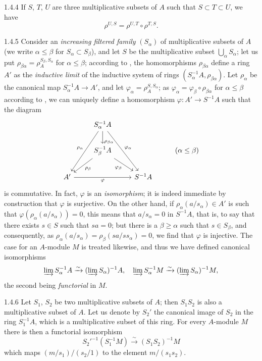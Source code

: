 \begin{env}{1.4.4}
\label{env-0.1.4.4}
If $S$, $T$, $U$ are three multiplicative subsets of $A$ such that $S\subset T\subset U$, we have
\[
  \rho^{U,S}=\rho^{U,T}\circ\rho^{T,S}.
\]
\end{env}

\begin{env}{1.4.5}
\label{env-0.1.4.5}
Consider an \emph{increasing filtered family} $(S_\alpha)$ of multiplicative subsets of $A$
(we write $\alpha\leq\beta$ for $S_\alpha\subset S_\beta$), and let $S$ be the multiplicative subset
$\bigcup_\alpha S_\alpha$; let us put $\rho_{\beta\alpha}=\rho_A^{S_\beta,S_\alpha}$ for $\alpha\leq\beta$;
according to , the homomorphisms $\rho_{\beta\alpha}$ define a ring $A'$ as the \emph{inductive limit}
of the inductive system of rings $(S_\alpha^{-1}A,\rho_{\beta\alpha})$. Let $\rho_\alpha$ be the canonical
map $S_\alpha^{-1}A\to A'$, and let $\varphi_\alpha=\rho_A^{S,S_\alpha}$; as
$\varphi_\alpha=\varphi_\beta\circ\rho_{\beta\alpha}$ for $\alpha\leq\beta$ according to
, we can uniquely define a homomorphism $\varphi\colon A'\to S^{-1}A$ such that the diagram
\[
  \begin{tikzcd}
    & S_\alpha^{-1}A\ar[ddl,"\rho_\alpha"']\ar[d,very near end,"\rho_{\beta\alpha}"]\ar[rdd,"\varphi_\alpha"]\\
    & S_\beta^{-1}A\ar[ld,"\rho_\beta"]\ar[rd,"\varphi_\beta"'] & & (\alpha\leq\beta)\\
    A' \ar[rr,"\varphi"'] & & S^{-1}A
  \end{tikzcd}
\]
is commutative. In fact, $\varphi$ is an \emph{isomorphism}; it is indeed immediate by construction that
$\varphi$ is surjective. On the other hand, if $\rho_\alpha(a/s_\alpha)\in A'$ is such that
${\varphi(\rho_\alpha(a/s_\alpha))=0}$, this means that $a/s_\alpha=0$ in $S^{-1}A$, that is, to say that
there exists $s\in S$ such that $sa=0$; but there is a $\beta\geq\alpha$ such that $s\in S_\beta$, and
consequently, as $\rho_\alpha(a/s_\alpha)=\rho_\beta(sa/ss_\alpha)=0$, we find that $\varphi$ is injective.
The case for an $A$-module $M$ is treated likewise, and thus we have defined canonical isomorphisms
\[
  \varinjlim S_\alpha^{-1}A\xrightarrow{\sim}(\varinjlim S_\alpha)^{-1}A,\quad
  \varinjlim S_\alpha^{-1}M\xrightarrow{\sim}(\varinjlim S_\alpha)^{-1}M,
\]
the second being \emph{functorial} in $M$.
\end{env}

\begin{env}{1.4.6}
\label{env-0.1.4.6}
Let $S_1$, $S_2$ be two multiplicative subsets of $A$; then $S_1 S_2$ is also a multiplicative subset
of $A$. Let us denote by $S_2'$ the canonical image of $S_2$ in the ring $S_1^{-1}A$, which is a multiplicative
subset of this ring. For every $A$-module $M$ there is then a functorial isomorphism
\[
  {S_2'}^{-1}(S_1^{-1}M)\xrightarrow{\sim}(S_1 S_2)^{-1}M
\]
which maps $(m/s_1)/(s_2/1)$ to the element $m/(s_1 s_2)$.
\end{env}

